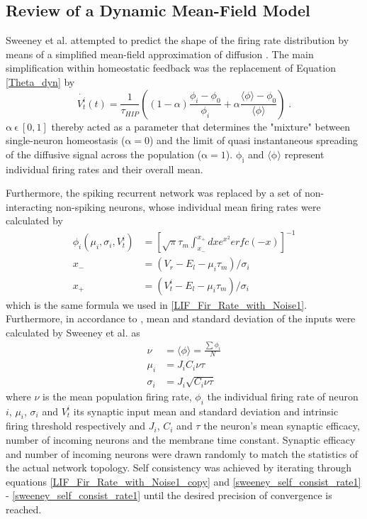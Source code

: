 \documentclass[10pt,a4paper]{article}
\begin{document}
\subsection{Review of a Dynamic Mean-Field Model}\label{Mean_Field_Review_Section}
Sweeney et al. attempted to predict the shape of the firing rate distribution by means of a simplified mean-field approximation of diffusion \cite{Sweeney_Paper}. The main simplification within homeostatic feedback was the replacement of Equation \ref{Theta_dyn} by
\begin{equation}
\dot{V_t^i}(t) = \frac{1}{\tau_{HIP}} \left( (1-\alpha)\frac{\phi_i-\phi_0}{\phi_i} +\alpha \frac{\langle \phi \rangle-\phi_0}{\langle \phi \rangle} \right)\;. 
\label{diff_hom_simpl_sweeney}
\end{equation}
$\mathrm{\alpha \: \epsilon \: [0,1]}$ thereby acted as a parameter that determines the "mixture" between single-neuron homeostasis ($\mathrm{\alpha=0}$) and the limit of quasi instantaneous spreading of the diffusive signal across the population ($\mathrm{\alpha=1}$). $\mathrm{\phi_i}$ and $\mathrm{\mathrm{\langle \phi \rangle}}$ represent individual firing rates and their overall mean.

Furthermore, the spiking recurrent network was replaced by a set of non-interacting non-spiking neurons, whose individual mean firing rates were calculated by
\begin{align}
\phi_i(\mu_i,\sigma_i,V_t^i) &= \left[ \sqrt{\pi}\tau_m \int_{x_-}^{x_+} dx e^{x^2} erfc(-x) \right]^{-1} \label{LIF_Fir_Rate_with_Noise1_copy}\\
x_- &= (V_r-E_l-\mu_i\tau_m)/\sigma_i \label{LIF_Fir_Rate_with_Noise2_copy}\\
x_+ &= (V_t^i-E_l-\mu_i\tau_m)/\sigma_i \label{LIF_Fir_Rate_with_Noise3_copy}
\end{align}
which is the same formula we used in \eqref{LIF_Fir_Rate_with_Noise1}. Furthermore, in accordance to \cite{Roxin_Firing_Rate_Distribution}, mean and standard deviation of the inputs were calculated by Sweeney et al. as
\begin{align}
\nu &= \langle \phi \rangle = \frac{\sum \phi_i}{N} \label{sweeney_self_consist_rate1} \\
\mu_i &= J_iC_i\nu \tau \label{sweeney_self_consist_rate2} \\
\sigma_i &= J_i\sqrt{C_i\nu  \tau} \label{sweeney_self_consist_rate3}
\end{align}
where $\nu$ is the mean population firing rate, $\phi_i$ the individual firing rate of neuron $i$, $\mu_i$, $\sigma_i$ and $V_t^i$ its synaptic input mean and standard deviation and intrinsic firing threshold respectively and $J_i$, $C_i$ and $\tau$ the neuron's mean synaptic efficacy, number of incoming neurons and the membrane time constant. Synaptic efficacy and number of incoming neurons were drawn randomly to match the statistics of the actual network topology. Self consistency was achieved by iterating through equations \eqref{LIF_Fir_Rate_with_Noise1_copy} and \eqref{sweeney_self_consist_rate1} - \eqref{sweeney_self_consist_rate1} until the desired precision of convergence is reached.
\end{document}
